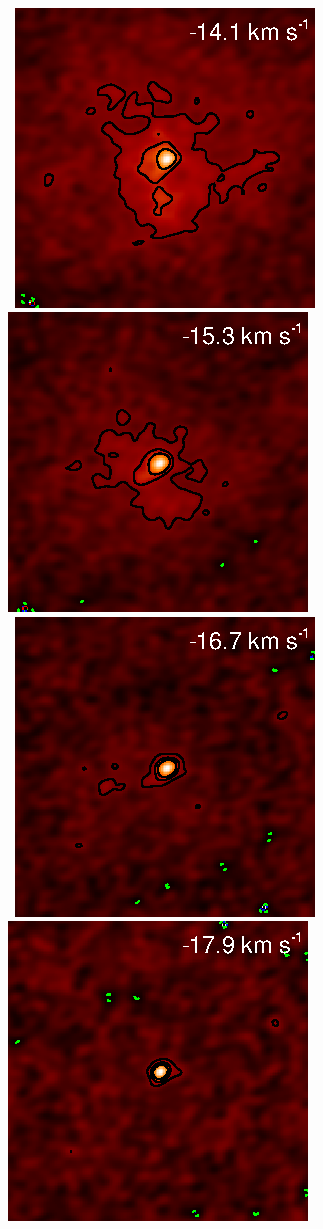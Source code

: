 \documentclass[preprint]{aastex}
\begin{document}
\begin{figure}
{          }
\\
\mbox{
          \includegraphics[]{test__38.ps}
          \includegraphics[]{test__39.ps}
          }
\\
\mbox{
          \includegraphics[]{test__40.ps}
          \includegraphics[]{test__41.ps}
}
\end{figure}
\end{document}
